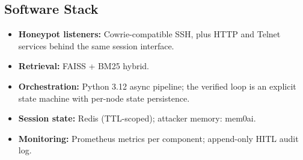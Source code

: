 \subsection{Software Stack}
\begin{itemize}
\item \textbf{Honeypot listeners:} Cowrie-compatible SSH, plus HTTP and
Telnet services behind the same session interface.
\item \textbf{Retrieval:} FAISS + BM25 hybrid.
\item \textbf{Orchestration:} Python 3.12 async pipeline; the verified
loop is an explicit state machine with per-node state persistence.
\item \textbf{Session state:} Redis (TTL-scoped); attacker memory: mem0ai.
\item \textbf{Monitoring:} Prometheus metrics per component; append-only
HITL audit log.
\end{itemize}
